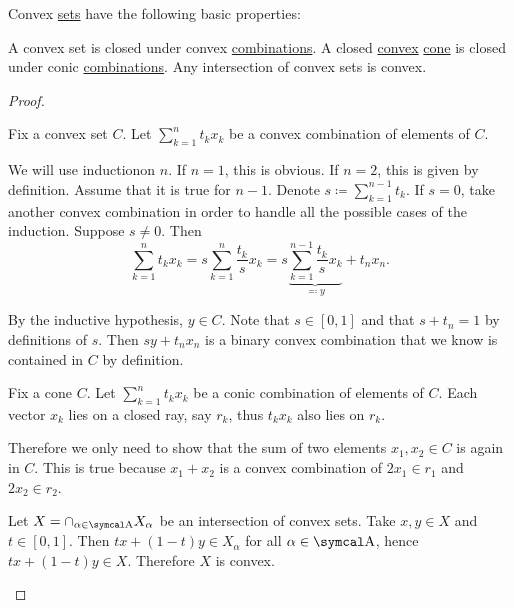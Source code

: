 \begin{proposition}\label{thm:convex_set_properties}
  Convex \hyperref[def:convex_set]{sets} have the following basic properties:

  \begin{propenum}
     A convex set is closed under convex \hyperref[def:linear_combination/convex]{combinations}.
     A closed \hyperref[def:convex_set]{convex} \hyperref[def:geometric_cone]{cone} is closed under conic \hyperref[def:linear_combination/conic]{combinations}.
     Any intersection of convex sets is convex.
  \end{propenum}
\end{proposition}
\begin{proof}\mbox{}
  \begin{description}
     Fix a convex set \( C \). Let \( \sum_{k=1}^n t_k x_k \) be a convex combination of elements of \( C \).

    We will use induction\IND on \( n \). If \( n = 1 \), this is obvious. If \( n = 2 \), this is given by definition. Assume that it is true for \( n - 1 \). Denote \( s \coloneqq \sum_{k=1}^{n-1} t_k \). If \( s = 0 \), take another convex combination in order to handle all the possible cases of the induction\IND. Suppose \( s \neq 0 \). Then
    \begin{equation*}
      \sum_{k=1}^n t_k x_k
      =
      s \sum_{k=1}^n \frac {t_k} s x_k
      =
      s \underbrace{\sum_{k=1}^{n-1} \frac {t_k} s x_k}_{\eqqcolon y} + t_n x_n.
    \end{equation*}

    By the inductive hypothesis, \( y \in C \). Note that \( s \in [0, 1] \) and that \( s + t_n = 1 \) by definitions of \( s \). Then \( s y + t_n x_n \) is a binary convex combination that we know is contained in \( C \) by definition.

     Fix a cone \( C \). Let \( \sum_{k=1}^n t_k x_k \) be a conic combination of elements of \( C \). Each vector \( x_k \) lies on a closed ray, say \( r_k \), thus \( t_k x_k \) also lies on \( r_k \).

    Therefore we only need to show that the sum of two elements \( x_1, x_2 \in C \) is again in \( C \). This is true because \( x_1 + x_2 \) is a convex combination of \( 2x_1 \in r_1 \) and \( 2x_2 \in r_2 \).

     Let \( X = \cap_{\alpha \in \CA} X_\alpha \) be an intersection of convex sets. Take \( x, y \in X \) and \( t \in [0, 1] \). Then \( tx + (1-t)y \in X_\alpha \) for all \( \alpha \in \CA \), hence \( tx + (1-t)y \in X \). Therefore \( X \) is convex.
  \end{description}
\end{proof}

